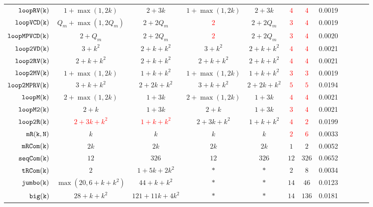 {\begin {table}[H]
\begin{center}
{\begin{tabular}{ | >{\tiny}r | c | c | c | c | c | c | c | c | c | c | c |}
         $  \mathtt{loopRV(k)}$   &  $ 1 + \max(1,2k)$ & $2 + 3 k$  &  $ 1 + \max(1,2k)$ & $2 + 3 k$ & \textcolor{red}{$4$} & \textcolor{red}{$4$} & 0.0019 \\
         $  {\mathtt{loopVCD(k)}} $  &  ${Q_m+\max(1,2Q_m)}$  & $2+2Q_m$  & \textcolor{red}{$2$} & $2+2Q_m$ & \textcolor{red}{$3$} & \textcolor{red}{$4$} & 0.0019 \\
         $ {\mathtt{loopMPVCD(k)}}$  &  $2 + Q_m$  & $2+2Q_m$  & \textcolor{red}{$2$} & $2+2Q_m$ & \textcolor{red}{$3$} & \textcolor{red}{$4$} & 0.0020 \\
         $  \mathtt{loop2VD(k)}$  &   $3 + k^2$ & $2 + k + k^2$   &  $3 + k^2$ & $2 + k + k^2$  & \textcolor{red}{$4$} & \textcolor{red}{$4$} & 0.0021 \\
         $  \mathtt{loop2RV(k)}$  &  $ 2 + k +  k^2 $    &  $2 + k + k^2$   &  $ 2 + k +  k^2 $    &  $2 + k + k^2$ & \textcolor{red}{$4$} & \textcolor{red}{$4$} & 0.0021 \\
         $  \mathtt{loop2MV(k)}$  & $1 + \max(1,2k) $ &  $1 + k + k^2$ & $1 + \max(1,2k) $ &  $1 + k + k^2$ & \textcolor{red}{$3$} & \textcolor{red}{$3$} & 0.0019 \\
         $ \mathtt{loop2MPRV(k)}$  &  $3 + k + k^2  $ &  $2 + 2k + k^2$  &  $3 + k + k^2  $ &  $2 + 2k + k^2$ & \textcolor{red}{$5$} &\textcolor{red}{$5$}  & 0.0194  \\
         {$ \mathtt{loopM(k)}$}  &  $ 2 + \max(1,2k) $ & $1 + 3k  $  &   $ 2 + \max(1,2k) $ & $1 + 3k  $  & \textcolor{red}{$4$} & \textcolor{red}{$4$} & 0.0021 \\
         {$ \mathtt{loopM2(k)}$}  &  $2 + k $ & $1 + 3k$  &  $2 + k $ & $1 + 3k$ & \textcolor{red}{$3$} & \textcolor{red}{$4$} & 0.0021 \\
         {$\mathtt{loop2R(k)}$}&  \textcolor{red}{$2 + 3k + k^2$} &  \textcolor{red}{$1 + k + k^2$}  &  $2 + 3k + k^2$ &  $1 + k + k^2$ & \textcolor{red}{$4$} & \textcolor{red}{$2$} & 0.0199 \\
         $  \mathtt{mR(k, N)}$ & $ k   $ & $k $   &  $ k   $ & $k $ & \textcolor{red}{$2$} & \textcolor{red}{$6$} & 0.0033 \\
         $  \mathtt{mRCom(k)}$  & $2k $ & $ 2k $   &  $  2k $ & $ 2k $ & $1$ & $2$ & 0.0052 \\
         $  \mathtt{seqCom(k)}$ & $12  $  & $326 $  &   $12  $  & $326 $ &$12  $  & $326 $ & 0.0652 \\
         $  \mathtt{tRCom(k)}$ &  $ 2$ & $ 1 + 5k + 2 k^2 $  &  $ * $   &   $* $ & $2$ & $8$ & 0.0034  \\
         $  \mathtt{{jumbo(k)}}$ & $  \max(20, 6+k+k^2)$   &   $ {44+k+k^2} $  &  $ * $   &  $* $ & $14$ & $46$ & 0.0123 \\
         $  {\mathtt{big(k)}} $ &   $28 + k + k^2$ &  $121+11k+4k^2 $  &  $ * $   &  $* $ & $14$ & $136$ & 0.0181 \\
        \hline \hline 
        \end{tabular}
}
\end{center}
\vspace{-0.5cm}
\end{table}
}


